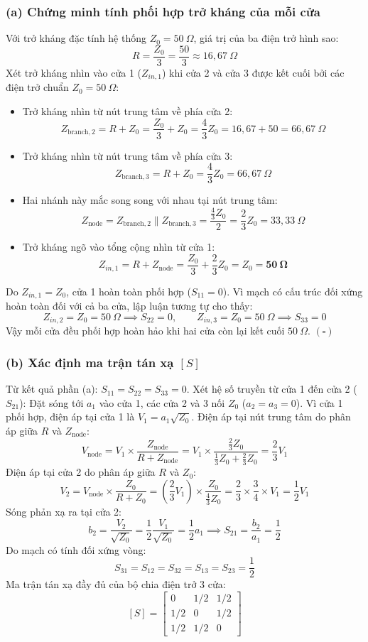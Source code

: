 \documentclass[12pt,a4paper]{article}
\begin{document}
\subsubsection{(a) Chứng minh tính phối hợp trở kháng của mỗi cửa}
Với trở kháng đặc tính hệ thống $Z_0 = 50~\Omega$, giá trị của ba điện trở hình sao:
\[
R = \frac{Z_0}{3} = \frac{50}{3} \approx 16{,}67~\Omega
\]
Xét trở kháng nhìn vào cửa 1 ($Z_{in,1}$) khi cửa 2 và cửa 3 được kết cuối bởi các điện trở chuẩn $Z_0 = 50~\Omega$:
\begin{itemize}
    \item Trở kháng nhìn từ nút trung tâm về phía cửa 2:
    \[
    Z_{\text{branch}, 2} = R + Z_0 = \frac{Z_0}{3} + Z_0 = \frac{4}{3} Z_0 = 16{,}67 + 50 = 66{,}67~\Omega
    \]
    \item Trở kháng nhìn từ nút trung tâm về phía cửa 3:
    \[
    Z_{\text{branch}, 3} = R + Z_0 = \frac{4}{3} Z_0 = 66{,}67~\Omega
    \]
    \item Hai nhánh này mắc song song với nhau tại nút trung tâm:
    \[
    Z_{\text{node}} = Z_{\text{branch}, 2} \parallel Z_{\text{branch}, 3} = \frac{\frac{4}{3}Z_0}{2} = \frac{2}{3} Z_0 = 33{,}33~\Omega
    \]
    \item Trở kháng ngõ vào tổng cộng nhìn từ cửa 1:
    \[
    Z_{in,1} = R + Z_{\text{node}} = \frac{Z_0}{3} + \frac{2}{3}Z_0 = Z_0 = \mathbf{50~\Omega}
    \]
\end{itemize}
Do $Z_{in,1} = Z_0$, cửa 1 hoàn toàn phối hợp ($S_{11} = 0$).
Vì mạch có cấu trúc đối xứng hoàn toàn đối với cả ba cửa, lập luận tương tự cho thấy:
\[
Z_{in,2} = Z_0 = 50~\Omega \implies S_{22} = 0, \qquad Z_{in,3} = Z_0 = 50~\Omega \implies S_{33} = 0
\]
Vậy mỗi cửa đều phối hợp hoàn hảo khi hai cửa còn lại kết cuối $50~\Omega$. $(\square)$

\subsubsection{(b) Xác định ma trận tán xạ $[S]$}
Từ kết quả phần (a): $S_{11} = S_{22} = S_{33} = 0$.
Xét hệ số truyền từ cửa 1 đến cửa 2 ($S_{21}$):
Đặt sóng tới $a_1$ vào cửa 1, các cửa 2 và 3 nối $Z_0$ ($a_2 = a_3 = 0$).
Vì cửa 1 phối hợp, điện áp tại cửa 1 là $V_1 = a_1 \sqrt{Z_0}$.
Điện áp tại nút trung tâm do phân áp giữa $R$ và $Z_{\text{node}}$:
\[
V_{\text{node}} = V_1 \times \frac{Z_{\text{node}}}{R + Z_{\text{node}}} = V_1 \times \frac{\frac{2}{3}Z_0}{\frac{1}{3}Z_0 + \frac{2}{3}Z_0} = \frac{2}{3} V_1
\]
Điện áp tại cửa 2 do phân áp giữa $R$ và $Z_0$:
\[
V_2 = V_{\text{node}} \times \frac{Z_0}{R + Z_0} = \left(\frac{2}{3} V_1\right) \times \frac{Z_0}{\frac{4}{3}Z_0} = \frac{2}{3} \times \frac{3}{4} \times V_1 = \frac{1}{2} V_1
\]
Sóng phản xạ ra tại cửa 2:
\[
b_2 = \frac{V_2}{\sqrt{Z_0}} = \frac{1}{2} \frac{V_1}{\sqrt{Z_0}} = \frac{1}{2} a_1 \implies S_{21} = \frac{b_2}{a_1} = \frac{1}{2}
\]
Do mạch có tính đối xứng vòng:
\[
S_{31} = S_{12} = S_{32} = S_{13} = S_{23} = \frac{1}{2}
\]
Ma trận tán xạ đầy đủ của bộ chia điện trở 3 cửa:
\[
\boxed{[S] = \begin{bmatrix} 0 & 1/2 & 1/2 \\ 1/2 & 0 & 1/2 \\ 1/2 & 1/2 & 0 \end{bmatrix}}
\]
\end{document}
